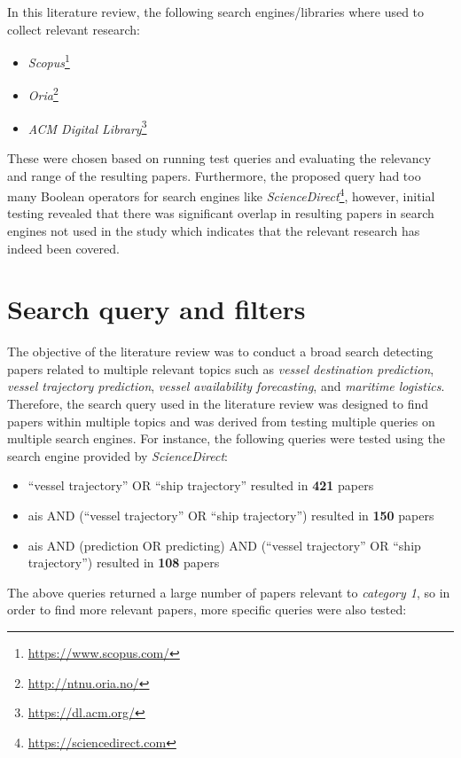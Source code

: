 In this literature review, the following search engines/libraries where used to collect relevant research:

\begin{itemize}
    \item \textit{Scopus}\footnote{\url{https://www.scopus.com/}}
    \item \textit{Oria}\footnote{\url{http://ntnu.oria.no/}}
    \item \textit{ACM Digital Library}\footnote{\url{https://dl.acm.org/}}
\end{itemize}

These were chosen based on running test queries and evaluating the relevancy and range of the resulting papers. Furthermore, the proposed query had too many Boolean operators for search engines like \textit{ScienceDirect}\footnote{\url{https://sciencedirect.com}}, however, initial testing revealed that there was significant overlap in resulting papers in search engines not used in the study which indicates that the relevant research has indeed been covered.

\section{Search query and filters}

The objective of the literature review was to conduct a broad search detecting papers related to multiple relevant topics such as \textit{vessel destination prediction}, \textit{vessel trajectory prediction}, \textit{vessel availability forecasting}, and \textit{maritime logistics}. Therefore, the search query used in the literature review was designed to find papers within multiple topics and was derived from testing multiple queries on multiple search engines. For instance, the following queries were tested using the search engine provided by \textit{ScienceDirect}:

\begin{itemize}
    \item ``vessel trajectory'' OR ``ship trajectory'' resulted in \textbf{421} papers
    \item ais AND (``vessel trajectory'' OR ``ship trajectory'') resulted in \textbf{150} papers
    \item ais AND (prediction OR predicting) AND (``vessel trajectory'' OR ``ship trajectory'') resulted in \textbf{108} papers
\end{itemize}

The above queries returned a large number of papers relevant to \textit{category 1}, so in order to find more relevant papers, more specific queries were also tested:

